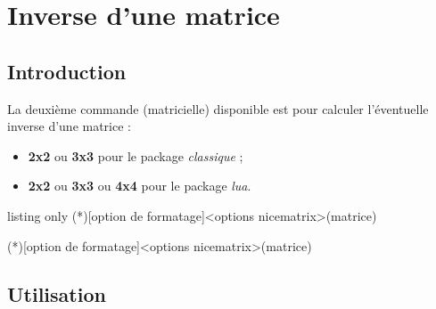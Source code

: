\documentclass[a4paper,11pt]{article}
\begin{document}
\section{Inverse d'une matrice}

\subsection{Introduction}

\begin{cautionblock}
La deuxième commande (matricielle) disponible est pour calculer l'éventuelle inverse d'une matrice :

\begin{itemize}
	\item \textbf{2x2} ou \textbf{3x3} pour le package \textit{classique} ;
	\item \textbf{2x2} ou \textbf{3x3} ou \textbf{4x4} pour le package \textit{lua}.
\end{itemize}
\end{cautionblock}

\begin{PresentationCode}{listing only}
\MatriceInverse(*)[option de formatage]<options nicematrix>(matrice)

\MatriceInverseLUA(*)[option de formatage]<options nicematrix>(matrice)
\end{PresentationCode}

\subsection{Utilisation}
\end{document}
